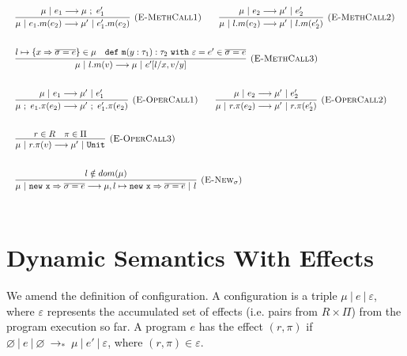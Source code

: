 \documentclass{llncs}
\newcommand{\keywadj}[1]{\mathtt{#1}}
\newcommand{\keyw}[1]{\keywadj{#1}~}
\begin{document}
\[
\begin{array}{lll}
\begin{array}{lllr}
	\infer[\textsc{(E-MethCall1)}]
		{\mu~|~e_1.m(e_2) \longrightarrow \mu'~|~e_1'.m(e_2)}
		{\mu~|~e_1 \longrightarrow \mu~;~e_1'}
		
		~~~~~~
		
	\infer[\textsc{(E-MethCall2)}]
		{\mu~|~l.m(e_2) \longrightarrow \mu'~|~l.m(e_2')}
		{\mu~|~e_2 \longrightarrow \mu'~|~e_2'}\\[5ex]
		
	\infer[\textsc{(E-MethCall3)}]
		{\mu~|~l.m(v)
			\longrightarrow
		 \mu~|~e'[l/x, v/y]}
  		{l \mapsto \{ x \Rightarrow \overline{\sigma = e} \} \in \mu & \keywadj{def~m}(y: \tau_1) : \tau_2~\keyw{with} \varepsilon = e' \in \overline {\sigma = e}} \\[5ex]

			
	\infer[\textsc{(E-OperCall1)}]
		{\mu~;~e_1.\pi(e_2)
			\longrightarrow
		 \mu'~;~e_1'.\pi(e_2)}
		{\mu~|~e_1 \longrightarrow \mu'~|~e_1'}
~~~~~~
			\infer[\textsc{(E-OperCall2)}]
		{\mu~|~r.\pi(e_2)
			\longrightarrow
		 \mu'~|~r.\pi(e_2')}
		{\mu~|~e_2 \longrightarrow \mu'~|~e_2'} \\[5ex]
			
			\infer[\textsc{(E-OperCall3)}]
		{\mu~|~r.\pi(v)
			\longrightarrow
		 \mu'~|~\keywadj{Unit}}
		{r \in R & \pi \in \Pi} \\[5ex]
			
	\infer[\textsc{(E-New$_\sigma$)}]
		{\mu~|~\keywadj{new~x} \Rightarrow \overline{\sigma = e}
			\longrightarrow
		 \mu, l \mapsto \keywadj{new~x} \Rightarrow \overline{\sigma = e}~|~l }
		{l \notin dom(\mu)} \\[5ex]
		
\end{array}
\end{array}
\]

\section{Dynamic Semantics With Effects}

We amend the definition of configuration. A configuration is a triple $\mu~|~e~|~\varepsilon$, where $\varepsilon$ represents the accumulated set of effects (i.e. pairs from $R \times \Pi$) from the program execution so far. A program $e$ has the effect $(r, \pi)$ if $\varnothing~|~e~|~\varnothing~\longrightarrow_*~\mu~|~e'~|~\varepsilon$, where $(r, \pi) \in \varepsilon$. 
\\
\end{document}
